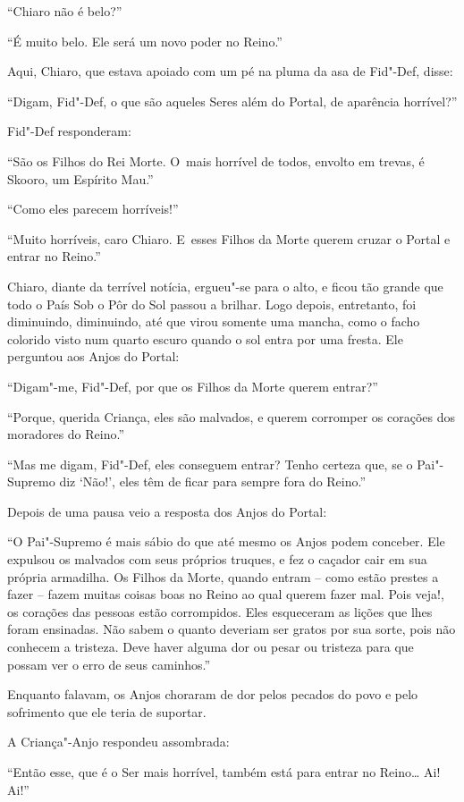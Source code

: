 ``Chiaro não é belo?''

``É muito belo. Ele será um novo poder no Reino.''

Aqui, Chiaro, que estava apoiado com um pé na pluma da asa de Fid"-Def,
disse:

``Digam, Fid"-Def, o que são aqueles Seres além do Portal, de aparência
horrível?''

Fid"-Def responderam:

``São os Filhos do Rei Morte. O~mais horrível de todos, envolto em
trevas, é Skooro, um Espírito Mau.''

``Como eles parecem horríveis!''

``Muito horríveis, caro Chiaro. E~esses Filhos da Morte querem cruzar o
Portal e entrar no Reino.''

Chiaro, diante da terrível notícia, ergueu"-se para o alto, e ficou tão
grande que todo o País Sob o Pôr do Sol passou a brilhar. Logo depois,
entretanto, foi diminuindo, diminuindo, até que virou somente uma
mancha, como o facho colorido visto num quarto escuro quando o sol entra
por uma fresta. Ele perguntou aos Anjos do Portal:

``Digam"-me, Fid"-Def, por que os Filhos da Morte querem entrar?''

``Porque, querida Criança, eles são malvados, e querem corromper os
corações dos moradores do Reino.''

``Mas me digam, Fid"-Def, eles conseguem entrar? Tenho certeza que, se o
Pai"-Supremo diz `Não!', eles têm de ficar para sempre fora do Reino.''

Depois de uma pausa veio a resposta dos Anjos do Portal:

``O Pai"-Supremo é mais sábio do que até mesmo os Anjos podem conceber.
Ele expulsou os malvados com seus próprios truques, e fez o caçador cair
em sua própria armadilha. Os Filhos da Morte, quando entram -- como
estão prestes a fazer -- fazem muitas coisas boas no Reino ao qual
querem fazer mal. Pois veja!, os corações das pessoas estão corrompidos.
Eles esqueceram as lições que lhes foram ensinadas. Não sabem o
quanto deveriam ser gratos por sua sorte, pois não conhecem a tristeza.
Deve haver alguma dor ou pesar ou tristeza para que possam ver
o erro de seus caminhos.''

Enquanto falavam, os Anjos choraram de dor pelos pecados do povo e pelo
sofrimento que ele teria de suportar.

A Criança"-Anjo respondeu assombrada:

``Então esse, que é o Ser mais horrível, também está para entrar no
Reino\ldots{} Ai! Ai!''

